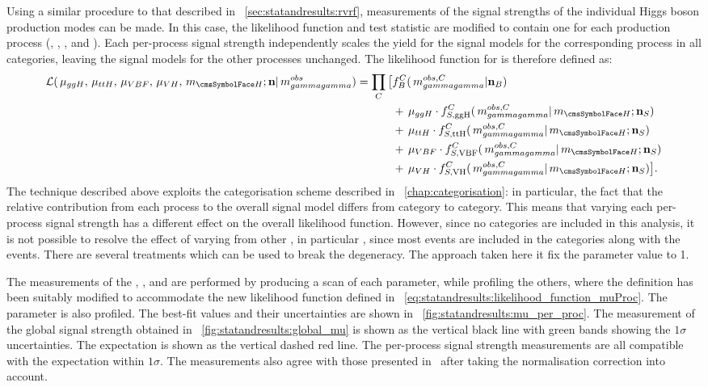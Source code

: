 Using a similar procedure to that described in \Sec~\ref{sec:statandresults:rvrf}, measurements of the signal strengths of the individual Higgs boson production modes can be made. In this case, the likelihood function and test statistic are modified to contain one \POI for each production process (\muggH, \muVBF, \muVH, and \muttH). Each per-process signal strength independently scales the yield for the signal models for the corresponding process in all categories, leaving the signal models for the other processes unchanged. The likelihood function for is therefore defined as:
\begin{equation}
\label{eq:statandresults:likelihood_function_muProc}
\begin{split}
\mathcal{L}(\muggH, \muttH,\muVBF,\muVH, \mH; \mathbf{n} | \mgg^{obs} ) = \prod_C \big[{} &f^C_B(\mgg^{obs,C} | \mathbf{n}_B ) \\ 
&+\muggH\cdot f^C_{S,{\text{ggH}}}(\mgg^{obs,C} |\mH; \mathbf{n}_S) \\ 
&+\muttH\cdot f^C_{S,{\text{ttH}}}(\mgg^{obs,C} |\mH; \mathbf{n}_S) \\ 
&+\muVBF\cdot f^C_{S,{\text{VBF}}}(\mgg^{obs,C} |\mH; \mathbf{n}_S) \\
&+\muVH \cdot f^C_{S,{\text{VH}}}(\mgg^{obs,C} |\mH; \mathbf{n}_S){}\big]. \\ 
\end{split}
\end{equation}
The technique described above exploits the categorisation scheme described in \Chapter~\ref{chap:categorisation}: in particular, the fact that the relative contribution from each process to the overall signal model differs from category to category. This means that varying each per-process signal strength has a different effect on the overall likelihood function. However, since no \VHTag categories are included in this analysis, it is not possible to resolve the effect of varying \muVH from other \POI\s, in particular \muggH, since most \VH events are included in the \Untagged categories along with the \ggH events. There are several treatments which can be used to break the degeneracy. The approach taken here it fix the \muVH parameter value to 1. 

The measurements of the \muggH, \muVBF, and \muttH are performed by producing a \DNLL scan of each parameter, while profiling the others, where the \DNLL definition has been suitably modified to accommodate the new likelihood function defined in \Eq~\ref{eq:statandresults:likelihood_function_muProc}. The \mH parameter is also profiled. The best-fit values and their uncertainties are shown in \Fig~\ref{fig:statandresults:mu_per_proc}. The measurement of the global signal strength obtained in \Sec~\ref{fig:statandresults:global_mu} is shown as the vertical black line with green bands showing the $1\sigma$ uncertainties. The \SM expectation is shown as the vertical dashed red line. The per-process signal strength measurements are all compatible with the \SM expectation within $1\sigma$. The measurements also agree with those presented in~\cite{CMS-PAS-HIG-16-020} after taking the normalisation correction into account. 

